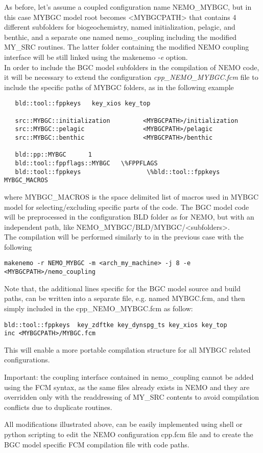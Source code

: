 \documentclass[../main/TOP_manual]{subfiles}
\begin{document}
As before, let's assume a coupled configuration name NEMO\_MYBGC, but in this case MYBGC model root becomes <MYBGCPATH> that contains 4 different subfolders for biogeochemistry, named initialization, pelagic, and benthic, and a separate one named nemo\_coupling including the modified MY\_SRC routines. The latter folder containing the modified NEMO coupling interface will be still linked using the makenemo \textit{-e} option. \\

In order to include the BGC model subfolders in the compilation of NEMO code, it will be necessary to extend the configuration \textit{cpp\_NEMO\_MYBGC.fcm} file to include the specific paths of MYBGC folders, as in the following example

\begin{verbatim}
   bld::tool::fppkeys   key_xios key_top

   src::MYBGC::initialization         <MYBGCPATH>/initialization
   src::MYBGC::pelagic                <MYBGCPATH>/pelagic
   src::MYBGC::benthic                <MYBGCPATH>/benthic

   bld::pp::MYBGC      1
   bld::tool::fppflags::MYBGC   \%FPPFLAGS
   bld::tool::fppkeys                  \%bld::tool::fppkeys MYBGC_MACROS
\end{verbatim}

where MYBGC\_MACROS is the space delimited list of macros used in MYBGC model for selecting/excluding specific parts of the code. The BGC model code will be preprocessed in the configuration BLD folder as for NEMO, but with an independent path, like NEMO\_MYBGC/BLD/MYBGC/<subfolders>.\\

The compilation will be performed similarly to in the previous case with the following

\begin{verbatim}
makenemo -r NEMO_MYBGC -m <arch_my_machine> -j 8 -e <MYBGCPATH>/nemo_coupling
\end{verbatim}

Note that, the additional lines specific for the BGC model source and build paths, can be written into a separate file, e.g. named MYBGC.fcm, and then simply included in the cpp\_NEMO\_MYBGC.fcm as follow:

\begin{verbatim}
bld::tool::fppkeys  key_zdftke key_dynspg_ts key_xios key_top
inc <MYBGCPATH>/MYBGC.fcm
\end{verbatim}

This will enable a more portable compilation structure for all MYBGC related configurations.

Important: the coupling interface contained in nemo\_coupling cannot be added using the FCM syntax, as the same files already exists in NEMO and they are overridden only with the readdressing of MY\_SRC contents to avoid compilation conflicts due to duplicate routines.

All modifications illustrated above, can be easily implemented using shell or python scripting to edit the NEMO configuration cpp.fcm file and to create the BGC model specific FCM compilation file with code paths.
\end{document}
